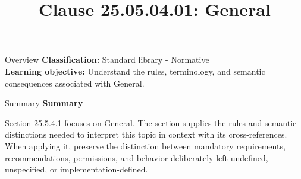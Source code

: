 \documentclass[10pt,letterpaper]{article}
\title{Clause 25.05.04.01: General}
\author{}
\date{}
\begin{document}
\maketitle
\begin{CornellOverviewBox}{Overview}
\textbf{Classification:} Standard library - Normative\\[2pt]
\textbf{Learning objective:} Understand the rules, terminology, and semantic consequences associated with General.
\end{CornellOverviewBox}\begin{CornellSummaryBox}{Summary}
{\sffamily\bfseries\color{Accent} Summary}\par\vspace{3pt}Section 25.5.4.1 focuses on General. The section supplies the rules and semantic distinctions needed to interpret this topic in context with its cross-references. When applying it, preserve the distinction between mandatory requirements, recommendations, permissions, and behavior deliberately left undefined, unspecified, or implementation-defined.
\end{CornellSummaryBox}
\end{document}
